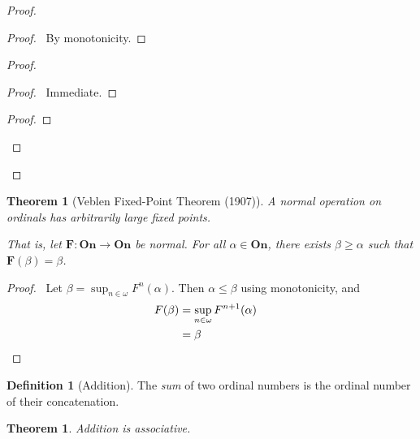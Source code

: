 \documentclass{report}
\let\qed\relax
\newtheorem{theorem}[axiom]{Theorem}
\theoremstyle{definition}
\newtheorem{definition}[axiom]{Definition}
\begin{document}
    \begin{proof}
        \pf
        \begin{proof}
            \pf\ By monotonicity.
        \end{proof}
        \begin{proof}
            \begin{proof}
                \pf\ Immediate.
            \end{proof}
            \begin{proof}
            \end{proof}
        \end{proof}
        \qed
    \end{proof}

    \begin{theorem}[Veblen Fixed-Point Theorem (1907)]
        A normal operation on ordinals has arbitrarily large fixed points.

        That is, let $\mathbf{F} : \mathbf{On} \rightarrow \mathbf{On}$ be normal. For all $\alpha \in
        \mathbf{On}$, there exists $\beta \geq \alpha$ such that $\mathbf{F}(\beta) = \beta$.
    \end{theorem}

    \begin{proof}
        \pf\ Let $\beta = \sup_{n \in \omega} F^n(\alpha)$. Then $\alpha \leq \beta$ using monotonicity,
        and
        \begin{align*}
            F(\beta) & = \sup_{n \in \omega} F^{n+1}(\alpha) \\
            & = \beta & \qed
        \end{align*}
    \end{proof}

    \begin{definition}[Addition]
        The \emph{sum} of two ordinal numbers is the ordinal number of their concatenation.
    \end{definition}

    \begin{theorem}
        Addition is associative.
    \end{theorem}
\end{document}
